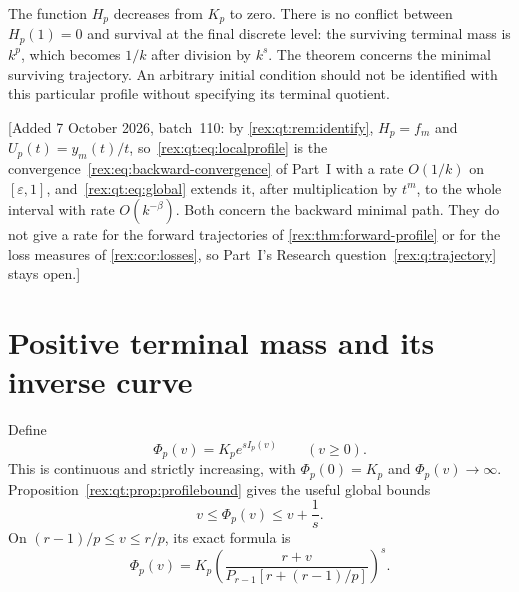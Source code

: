 The function $H_p$ decreases from $K_p$ to zero. There is no conflict between $H_p(1)=0$ and survival at the final discrete level: the surviving terminal mass is $k^p$, which becomes $1/k$ after division by $k^s$. The theorem concerns the minimal surviving trajectory. An arbitrary initial condition should not be identified with this particular profile without specifying its terminal quotient.

[Added 7 October 2026, batch~110: by \cref{rex:qt:rem:identify},
$H_p=f_m$ and $U_p(t)=y_m(t)/t$, so~\eqref{rex:qt:eq:localprofile} is the
convergence~\eqref{rex:eq:backward-convergence} of Part~I with a rate
$O(1/k)$ on $[\varepsilon,1]$, and~\eqref{rex:qt:eq:global} extends it,
after multiplication by $t^m$, to the whole interval with rate
$O(k^{-\beta})$. Both concern the backward minimal path. They do not give
a rate for the forward trajectories of \cref{rex:thm:forward-profile} or
for the loss measures of \cref{rex:cor:losses}, so Part~I's Research
question~\ref{rex:q:trajectory} stays open.]

\section{Positive terminal mass and its inverse curve}\label{rex:qt:sec:terminal}
Define
\begin{equation}\label{rex:qt:eq:Phi}
 \Phi_p(v)=K_p e^{sI_p(v)}\qquad(v\ge0).
\end{equation}
This is continuous and strictly increasing, with $\Phi_p(0)=K_p$ and $\Phi_p(v)\to\infty$. Proposition~\ref{rex:qt:prop:profilebound} gives the useful global bounds
\begin{equation}\label{rex:qt:eq:Phibounds}
 v\le\Phi_p(v)\le v+\frac1s.
\end{equation}
On $(r-1)/p\le v\le r/p$, its exact formula is
\begin{equation}\label{rex:qt:eq:Phiexplicit}
 \Phi_p(v)=K_p\left(\frac{r+v}
 {P_{r-1}[r+(r-1)/p]}\right)^s.
\end{equation}

